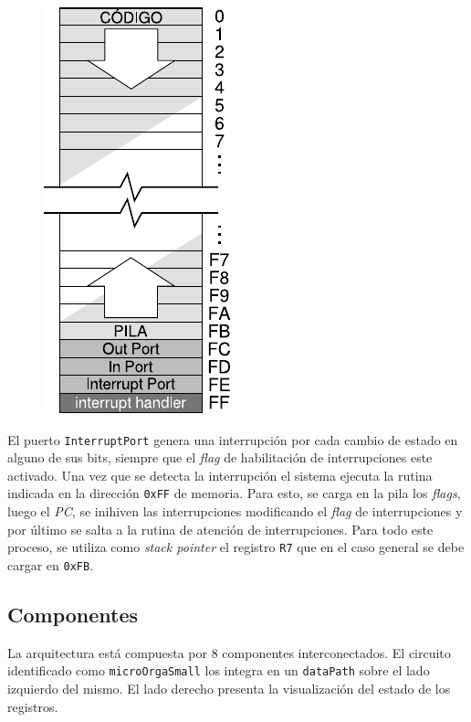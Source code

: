 \documentclass[a4paper,11pt]{article}
\begin{document}
\begin{figure}
\begin{center}
\includegraphics[scale=0.7]{img/mapa_de_memoria.pdf}
\end{center}
\vspace{-1cm}
\end{figure}

El puerto \texttt{InterruptPort} genera una interrupción por cada cambio de estado en alguno de sus bits, siempre que el \emph{flag} de habilitación de interrupciones este activado.
Una vez que se detecta la interrupción el sistema ejecuta la rutina indicada en la dirección \texttt{0xFF} de memoria.
Para esto, se carga en la pila los \emph{flags}, luego el \emph{PC}, se inihiven las interrupciones modificando el \emph{flag} de interrupciones y por último se salta a la rutina de atención de interrupciones.
Para todo este proceso, se utiliza como \emph{stack pointer} el registro \texttt{R7} que en el caso general se debe cargar en \texttt{0xFB}.

\subsection*{Componentes}

La arquitectura está compuesta por 8 componentes interconectados.
El circuito identificado como \texttt{microOrgaSmall} los integra en un \texttt{dataPath} sobre el lado izquierdo del mismo.
El lado derecho presenta la visualización del estado de los registros.
\end{document}
